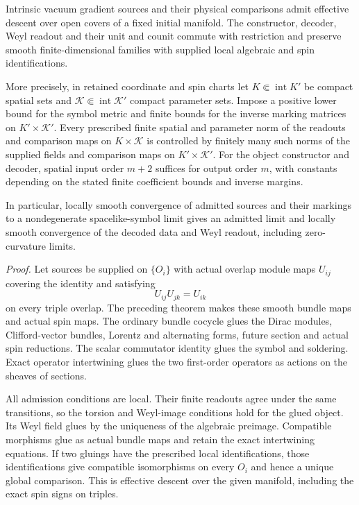 \documentclass[
  english,
  11pt,
  reqno]{amsart}
\begin{document}
Intrinsic vacuum gradient sources and their physical comparisons admit
effective descent over open covers of a fixed initial manifold. The
constructor, decoder, Weyl readout and their unit and counit commute
with restriction and preserve smooth finite-dimensional families with
supplied local algebraic and spin identifications.

More precisely, in retained coordinate and spin charts let
\(K\Subset\operatorname{int}K'\) be compact spatial sets and
\(\mathcal K\Subset\operatorname{int}\mathcal K'\) compact parameter
sets. Impose a positive lower bound for the symbol metric and finite
bounds for the inverse marking matrices on \(K'\times\mathcal K'\).
Every prescribed finite spatial and parameter norm of the readouts and
comparison maps on \(K\times\mathcal K\) is controlled by finitely many
such norms of the supplied fields and comparison maps on
\(K'\times\mathcal K'\). For the object constructor and decoder, spatial
input order \(m+2\) suffices for output order \(m\), with constants
depending on the stated finite coefficient bounds and inverse margins.

In particular, locally smooth convergence of admitted sources and their
markings to a nondegenerate spacelike-symbol limit gives an admitted
limit and locally smooth convergence of the decoded data and Weyl
readout, including zero-curvature limits.

\emph{Proof.} Let sources be supplied on \(\{O_i\}\) with actual overlap
module maps \(U_{ij}\) covering the identity and satisfying%
 \[
U_{ij}U_{jk}=U_{ik}
\] on every triple overlap. The preceding theorem makes these smooth
bundle maps and actual spin maps. The ordinary bundle cocycle glues the
Dirac modules, Clifford-vector bundles, Lorentz and alternating forms,
future section and actual spin reductions. The scalar commutator
identity glues the symbol and soldering. Exact operator intertwining
glues the two first-order operators as actions on the sheaves of
sections.

All admission conditions are local. Their finite readouts agree under
the same transitions, so the torsion and Weyl-image conditions hold for
the glued object. Its Weyl field glues by the uniqueness of the
algebraic preimage. Compatible morphisms glue as actual bundle maps and
retain the exact intertwining equations. If two gluings have the
prescribed local identifications, those identifications give compatible
isomorphisms on every \(O_i\) and hence a unique global comparison. This
is effective descent over the given manifold, including the exact spin
signs on triples.
\end{document}
